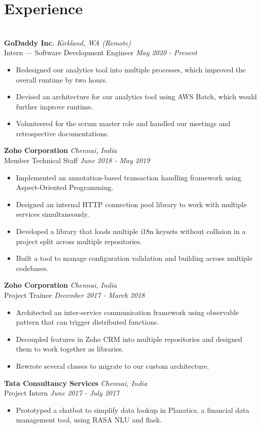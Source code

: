 \documentclass{resume}
\begin{document}
\section*{Experience}
\titlerule
\noindent
\\
\textbf{GoDaddy Inc.} \hfill \textit{Kirkland, WA (Remote)} \\
{\small Intern --- Software Development Engineer} \hfill \textit{\small May 2020 - Present}
\begin{itemize}
  \item Redesigned our analytics tool into multiple processes, which improved the overall runtime by two hours.
  \item Devised an architecture for our analytics tool using AWS Batch, which would further improve runtime.
  \item Volunteered for the scrum master role and handled our meetings and retrospective documentations.
\end{itemize}
\textbf{Zoho Corporation} \hfill \textit{Chennai, India} \\
{\small Member Technical Staff} \hfill \textit{\small June 2018 - May 2019}
\begin{itemize}
  \item Implemented an annotation-based transaction handling framework using Aspect-Oriented Programming.
  \item Designed an internal HTTP connection pool library to work with multiple services simultaneously.
  \item Developed a library that loads multiple i18n keysets without collision in a project split across multiple repositories.
  \item Built a tool to manage configuration validation and building across multiple codebases.
\end{itemize}
\textbf{Zoho Corporation} \hfill \textit{Chennai, India} \\
{\small Project Trainee} \hfill \textit{\small December 2017 - March 2018}
\begin{itemize}
  \item Architected an inter-service communication framework using observable pattern that can trigger distributed functions.
  \item Decoupled features in Zoho CRM into multiple repositories and designed them to work together as libraries.
  \item Rewrote several classes to migrate to our custom architecture.
\end{itemize}
\textbf{Tata Consultancy Services} \hfill \textit{Chennai, India} \\
{\small Project Intern} \hfill \textit{\small June 2017 - July 2017}
\begin{itemize}
  \item Prototyped a chatbot to simplify data lookup in Planatics, a financial data management tool, using RASA NLU and flask.
\end{itemize}
\end{document}
